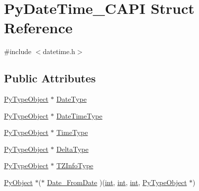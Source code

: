 \hypertarget{struct_py_date_time___c_a_p_i}{}\section{Py\+Date\+Time\+\_\+\+C\+A\+PI Struct Reference}
\label{struct_py_date_time___c_a_p_i}


{\ttfamily \#include $<$datetime.\+h$>$}

\subsection*{Public Attributes}
\begin{DoxyCompactItemize}
\item 
\mbox{\hyperlink{_python27_2object_8h_a42a55dd6e973872c7a6bc61632070f6f}{Py\+Type\+Object}} $\ast$ \mbox{\hyperlink{struct_py_date_time___c_a_p_i_abfafd0453a7f387ab8f4365431543905}{Date\+Type}}
\item 
\mbox{\hyperlink{_python27_2object_8h_a42a55dd6e973872c7a6bc61632070f6f}{Py\+Type\+Object}} $\ast$ \mbox{\hyperlink{struct_py_date_time___c_a_p_i_a85f29d980c43599949a37890882e5051}{Date\+Time\+Type}}
\item 
\mbox{\hyperlink{_python27_2object_8h_a42a55dd6e973872c7a6bc61632070f6f}{Py\+Type\+Object}} $\ast$ \mbox{\hyperlink{struct_py_date_time___c_a_p_i_a14967c0f0703a60b53eee61f3a868c82}{Time\+Type}}
\item 
\mbox{\hyperlink{_python27_2object_8h_a42a55dd6e973872c7a6bc61632070f6f}{Py\+Type\+Object}} $\ast$ \mbox{\hyperlink{struct_py_date_time___c_a_p_i_a0fb84e80d67fd689d265d94811418231}{Delta\+Type}}
\item 
\mbox{\hyperlink{_python27_2object_8h_a42a55dd6e973872c7a6bc61632070f6f}{Py\+Type\+Object}} $\ast$ \mbox{\hyperlink{struct_py_date_time___c_a_p_i_a967e1a42dd00881315101a1f09ee61c8}{T\+Z\+Info\+Type}}
\item 
\mbox{\hyperlink{_python27_2object_8h_aadc84ac7aed2cfa6f20c25f62bf3dac7}{Py\+Object}} $\ast$($\ast$ \mbox{\hyperlink{struct_py_date_time___c_a_p_i_aa87be8a59753b780632df32f8e450477}{Date\+\_\+\+From\+Date}} )(\mbox{\hyperlink{warnings_8h_a74f207b5aa4ba51c3a2ad59b219a423b}{int}}, \mbox{\hyperlink{warnings_8h_a74f207b5aa4ba51c3a2ad59b219a423b}{int}}, \mbox{\hyperlink{warnings_8h_a74f207b5aa4ba51c3a2ad59b219a423b}{int}}, \mbox{\hyperlink{_python27_2object_8h_a42a55dd6e973872c7a6bc61632070f6f}{Py\+Type\+Object}} $\ast$)
\item 

\end{DoxyCompactItemize}
